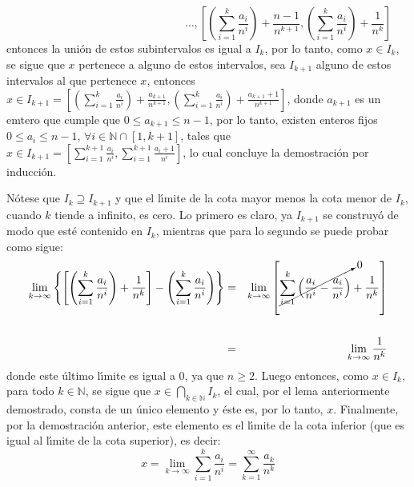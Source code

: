 \begin{solucion}
\begin{demostracion}
\begin{equation*}
  \end{equation*}
  \begin{equation*}
   \hspace{6cm} \ldots, \left[ \left( \sum_{i=1}^{k} \frac{a_i}{n^i} \right) + \frac{n-1}{n^{k+1}}, \left( \sum_{i=1}^{k} \frac{a_i}{n^i} \right) + \frac{1}{n^{k}} \right]
  \end{equation*}
  entonces la uni\'on de estos subintervalos es igual a $I_k$, por lo tanto, como $x\in I_k$, se sigue que $x$ pertenece a alguno de estos intervalos, sea $I_{k+1}$ alguno de estos intervalos al que pertenece $x$, entonces $x\in I_{k+1} = \left[ \left( \sum_{i=1}^{k} \frac{a_i}{n^i} \right) + \frac{a_{k+1}}{n^{k+1}}, \left( \sum_{i=1}^{k} \frac{a_i}{n^i} \right) + \frac{a_{k+1}+1}{n^{k+1}} \right]$, donde $a_{k+1}$ es un emtero que cumple que $0 \leq a_{k+1} \leq n-1$, por lo tanto, existen enteros fijos $0 \leq a_i \leq n-1$, $\forall i \in\mathbb{N}\cap[1,k+1]$, tales que $x \in I_{k+1} = \left[ \sum_{i=1}^{k+1} \frac{a_i}{n^i}, \sum_{i=1}^{k+1} \frac{a_i + 1}{n^i} \right]$, lo cual concluye la demostraci\'on por inducci\'on.
  \par 
  N\'otese que $I_k \supseteq I_{k+1}$ y que el l\'{\i}mite de la cota mayor menos la cota menor de $I_{k}$, cuando $k$ tiende a infinito, es cero. Lo primero es claro, ya $I_{k+1}$ se construy\'o de modo que est\'e contenido en $I_k$, mientras que para lo segundo se puede probar como sigue:
  \begin{eqnarray*}
   \displaystyle{ \lim_{k\to\infty} \left\{ \left[ \left ( \sum_{i=1}^{k} \frac{a_i}{n^i} \right) + \frac{1}{n^k} \right] - \left( \sum_{i=1}^{k} \frac{a_i}{n^i} \right) \right\} }
   & = & \displaystyle{ \lim_{k\to\infty} \left[ \cancelto{0}{ \sum_{i=1}^{k} \left(\frac{a_i}{n^i} - \frac{a_i}{n^i}  \right)} + \frac{1}{n^k} \right] } \\
   \\
   & = & \lim_{k\to\infty} \frac{1}{n^k}
  \end{eqnarray*}
  donde este \'ultimo l\'{\i}mite es igual a $0$, ya que $n \geq 2$.
  Luego entonces, como $x \in I_{k}$, para todo $k\in \mathbb{N}$, se sigue que $x \in \bigcap_{k\in\mathbb{N}} I_k$, el cual, por el lema anteriormente demostrado, consta de un \'unico elemento y \'este es, por lo tanto, $x$. Finalmente, por la demostraci\'on anterior, este elemento es el l\'{\i}mite de la cota inferior (que es igual al l\'{\i}mite de la cota superior), es decir: 
  \begin{equation*}
   x = \lim_{k \to \infty} \sum_{i=1}^{k} \frac{a_i}{n^i} = \sum_{k=1}^{\infty} \frac{a_k}{n^k}

\end{equation*}
\end{demostracion}
\end{solucion}
